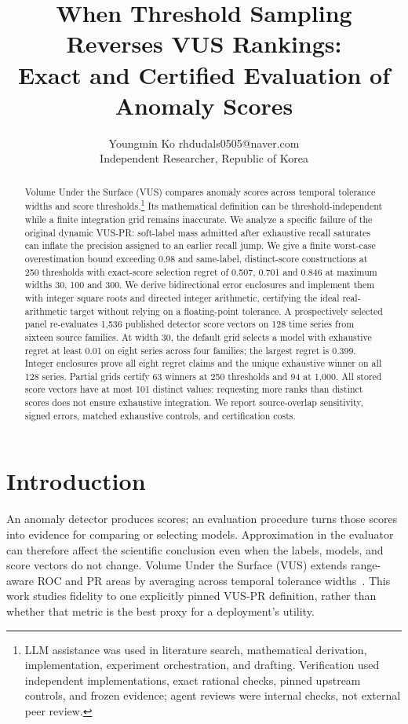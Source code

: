 \documentclass[10pt]{article}
\title{When Threshold Sampling Reverses VUS Rankings:\\
Exact and Certified Evaluation of Anomaly Scores}
\author{\name Youngmin Ko \email rhdudals0505@naver.com\\
\addr Independent Researcher, Republic of Korea}
\begin{document}
\maketitle
\begin{abstract}
Volume Under the Surface (VUS) compares anomaly scores across temporal
tolerance widths and score thresholds.\footnote{LLM assistance was used in
literature search, mathematical derivation, implementation, experiment
orchestration, and drafting. Verification used independent implementations,
exact rational checks, pinned upstream controls, and frozen evidence;
agent reviews were internal checks, not external peer review.}
Its mathematical definition can
be threshold-independent while a finite integration grid remains
inaccurate. We analyze a specific failure of the original dynamic VUS-PR:
soft-label mass admitted after exhaustive recall saturates can inflate
the precision assigned to an earlier recall jump. We give a finite
worst-case overestimation bound exceeding 0.98 and same-label, distinct-score
constructions at 250 thresholds with exact-score selection regret of
0.507, 0.701 and 0.846 at maximum widths 30, 100 and 300.
We derive bidirectional error enclosures and implement them with integer
square roots and directed integer arithmetic, certifying the ideal
real-arithmetic target without relying on a floating-point tolerance.
A prospectively selected panel re-evaluates 1,536 published detector score
vectors on 128 time series from sixteen source families. At width 30,
the default grid selects a model with exhaustive regret at least 0.01
on eight series across four families; the largest regret is 0.399.
Integer enclosures prove all eight regret claims and the unique
exhaustive winner on all 128 series. Partial grids certify 63 winners
at 250 thresholds and 94 at 1,000. All stored score vectors have at most
101 distinct values: requesting more ranks than distinct scores does
not ensure exhaustive integration. We report source-overlap sensitivity,
signed errors, matched exhaustive controls, and certification costs.
\end{abstract}

\section{Introduction}
An anomaly detector produces scores; an evaluation procedure turns those
scores into evidence for comparing or selecting models. Approximation in
the evaluator can therefore affect the scientific conclusion even when
the labels, models, and score vectors do not change. Volume Under the
Surface (VUS) extends range-aware ROC and PR areas by averaging across
temporal tolerance widths~\citep{paparrizos2022,boniol2025}. This work
studies fidelity to one explicitly pinned VUS-PR definition, rather than
whether that metric is the best proxy for a deployment's utility.
\end{document}
